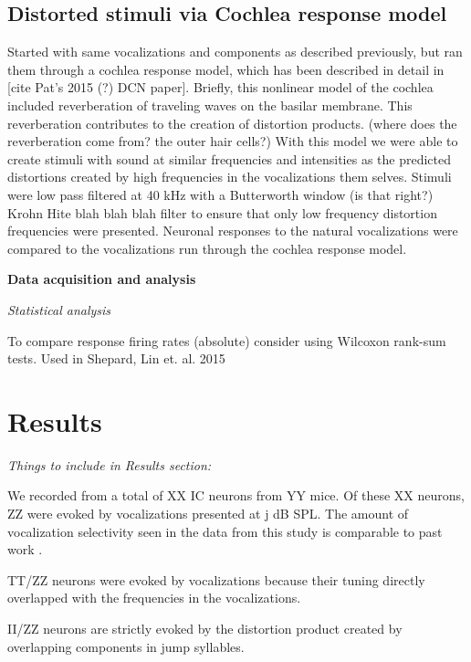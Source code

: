 \documentclass[12pt]{article}
\begin{document}
\subsection{Distorted stimuli via Cochlea response model}
Started with same vocalizations and components as described previously, but ran them through a cochlea response model, which has been described in detail in [cite Pat's 2015 (?) DCN paper]. Briefly, this nonlinear model of the cochlea included reverberation of traveling waves on the basilar membrane. This reverberation contributes to the creation of distortion products. (where does the reverberation come from? the outer hair cells?) With this model we were able to create stimuli with sound at similar frequencies and intensities as the predicted distortions created by high frequencies in the vocalizations them selves. Stimuli were low pass filtered at 40 kHz with a Butterworth window (is that right?) Krohn Hite blah blah blah filter to ensure that only low frequency distortion frequencies were presented. Neuronal responses to the natural vocalizations were compared to the vocalizations run through the cochlea response model. 

\vspace{3mm}
\textbf{Data acquisition and analysis}



\vspace{3mm}
\noindent \textit{Statistical analysis}

To compare response firing rates (absolute) consider using Wilcoxon rank-sum tests. Used in Shepard, Lin et. al. 2015 


\section*{\label{sec:results}Results}
\textit{Things to include in Results section:} 

We recorded from a total of XX IC neurons from YY mice. Of these XX neurons, ZZ were evoked by vocalizations presented at j dB SPL. The amount of vocalization selectivity seen in the data from this study is comparable to past work \cite{holmstromefficient2010}.

TT/ZZ neurons were evoked by vocalizations because their tuning directly overlapped with the frequencies in the vocalizations.

II/ZZ neurons are strictly evoked by the distortion product created by overlapping components in jump syllables. 
\end{document}
